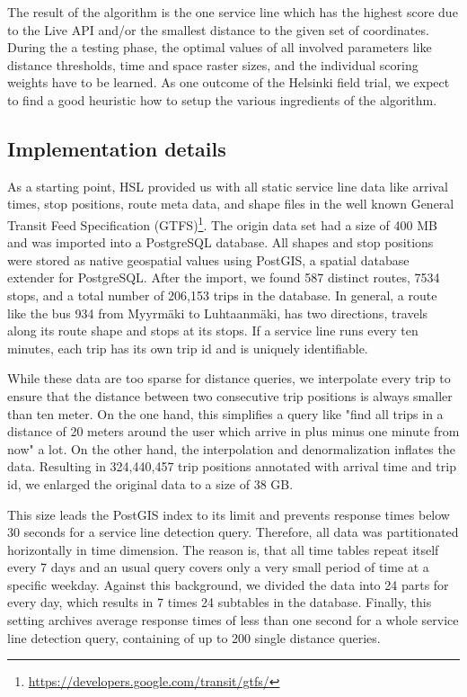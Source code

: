 \documentclass[external]{20120615_deliverable_template_ukob}
\theoremstyle{definition}
\begin{document}
The result of the algorithm is the one service line which has the highest score due to the Live API and/or the smallest distance to the given set of coordinates. During the a testing phase, the optimal values of all involved parameters like distance thresholds, time and space raster sizes, and the individual scoring weights have to be learned. As one outcome of the Helsinki field trial, we expect to find a good heuristic how to setup the various ingredients of the algorithm.

\subsection{Implementation details}
As a starting point, HSL provided us with all static service line data like arrival times, stop positions, route meta data, and shape files in the well known General Transit Feed Specification (GTFS)\footnote{\url{https://developers.google.com/transit/gtfs/}}. The origin data set had a size of 400 MB and was imported into a PostgreSQL database. All shapes and stop positions were stored as native geospatial values using PostGIS, a spatial database extender for PostgreSQL. After the import, we found 587 distinct routes, 7534 stops, and a total number of 206,153 trips in the database. In general, a route like the bus 934 from Myyrm\"{a}ki to Luhtaanm\"{a}ki, has two directions, travels along its route shape and stops at its stops. If a service line runs every ten minutes, each trip has its own trip id and is uniquely identifiable.

While these data are too sparse for distance queries, we interpolate every trip to ensure that the distance between two consecutive trip positions is always smaller than ten meter. On the one hand, this simplifies a query like "find all trips in a distance of 20 meters around the user which arrive in plus minus one minute from now" a lot. On the other hand, the interpolation and denormalization inflates the data. Resulting in 324,440,457 trip positions annotated with arrival time and trip id, we enlarged the original data to a size of 38 GB.

This size leads the PostGIS index to its limit and prevents response times below 30 seconds for a service line detection query. Therefore, all data was partitionated horizontally in time dimension. The reason is, that all time tables repeat itself every 7 days and an usual query covers only a very small period of time at a specific weekday. Against this background, we divided the data into 24 parts for every day, which results in 7 times 24 subtables in the database. Finally, this setting archives average response times of less than one second for a whole service line detection query, containing of up to 200 single distance queries.
\end{document}
